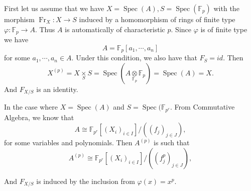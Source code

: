 \documentclass{article}
\numberwithin{equation}{section}
\DeclareMathOperator{\Spec}{Spec}
\DeclareMathOperator{\Fr}{Fr}
\newcommand{\fib}[1]{%
  \mathbin{\mathop{\times}\limits_{#1}}%
}
\newcommand{\tens}[1]{%
  \mathbin{\mathop{\otimes}\limits_{#1}}%
}
\begin{document}
First let us assume that we have $X=\Spec(A), S = \Spec(\mathbb{F}_{p})$ with the morphism $\Fr_X:X\to S$ induced by a homomorphism of rings of finite type $\varphi:\mathbb{F}_{p}\to A$. Thus $A$ is automatically of characteristic $p$. Since $\varphi$ is of finite type we have
\begin{equation*}
A = \mathbb{F}_{p}[a_1,\cdots,a_n]
\end{equation*}
for some $a_1,\cdots,a_n\in A$. Under this condition, we also have that $F_S = id$. Then 
\begin{equation*}
X^{(p)} = X\fib{S}S = \Spec(A\tens{\mathbb{F}_p}\mathbb{F}_p) = \Spec(A) = X.
\end{equation*}
And $F_{X/S}$ is an identity.\\
\par In the case where $X=\Spec(A)$ and $S=\Spec(\mathbb{F}_{p^r}$. From Commutative Algebra, we know that 
\begin{equation*}
A \cong \mathbb{F}_{p^r}[(X_i)_{i\in I}]/((f_j)_{j\in J}),
\end{equation*}
for some variables and polynomials. Then $A^{(p)}$ is such that 
\begin{equation*}
A^{(p)} \cong \mathbb{F}_{p^r}[(X_i)_{i\in I}]/((f_j^p)_{j\in J}),
\end{equation*}

And $F_{X/S}$ is induced by the inclusion from $\varphi(x) = x^p$.
\end{document}
